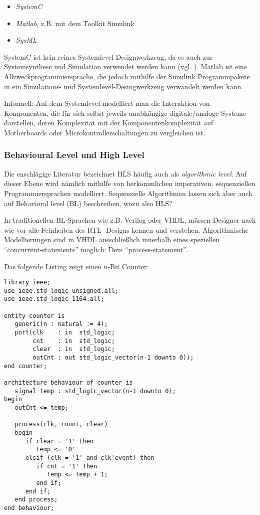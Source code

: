 \documentclass[oneside,a4paper]{article}
\begin{document}
\begin{itemize}
  \item \emph{SystemC}
  \item \emph{Matlab}, z.B. mit dem Toolkit Simulink
  \item \emph{SysML}
\end{itemize}

SystemC ist kein reines Systemlevel Designwerkzeug, da es auch zur Systemsynthese
und Simulation verwendet werden kann (vgl. \cite{SYSTEMC}).
Matlab ist eine Allzweckprogrammiersprache, die jedoch mithilfe der Simulink
Programmpakete in ein Simulations- und Systemlevel-Desingwerkzeug
verwandelt werden kann.

Informell:
Auf dem Systemlevel modelliert man die Interaktion von Komponenten, die
für sich selbst jeweils unabhängige digitale/analoge Systeme darstellen, deren
Komplexität mit der Komponentenkomplexität auf Motherboards oder
Microkontrollerschaltungen zu vergleichen ist.

\subsubsection{Behavioural Level und High Level}
Die enschlägige Literatur bezeichnet HLS häufig auch als \emph{algorithmic level}.
Auf dieser Ebene wird nämlich mithilfe von herkömmlichen imperativen, sequenziellen
Programmiersprachen modelliert. Sequenzielle Algorithmen lassen sich
aber auch auf Behavioral level (BL) beschreiben, wozu also HLS?

In traditionellen BL-Sprachen
wie z.B. Verilog oder VHDL, müssen Designer nach wie vor alle Feinheiten des RTL-
Designs kennen und verstehen. Algorithmische Modellierungen sind in VHDL ausschließlich
innerhalb eines speziellen ``concurrent-statements'' möglich: Dem ``process-statement''.

Das folgende Listing zeigt einen n-Bit Counter:
\begin{lstlisting}[style=vhdl,caption={N-Bit Counter},label=counter]
library ieee;
use ieee.std_logic_unsigned.all;
use ieee.std_logic_1164.all;

entity counter is
   generic(n : natural := 4);
   port(clk    : in  std_logic;
        cnt    : in  std_logic;
        clear  : in  std_logic;
        outCnt : out std_logic_vector(n-1 downto 0));
end counter;

architecture behaviour of counter is
   signal temp : std_logic_vector(n-1 downto 0);
begin
   outCnt <= temp;

   process(clk, count, clear)
   begin
      if clear = '1' then
         temp <= '0'
      elsif (clk = '1' and clk'event) then
         if cnt = '1' then
            temp <= temp + 1;
         end if;
      end if;
   end process;
end behaviour;
\end{lstlisting}
\end{document}
